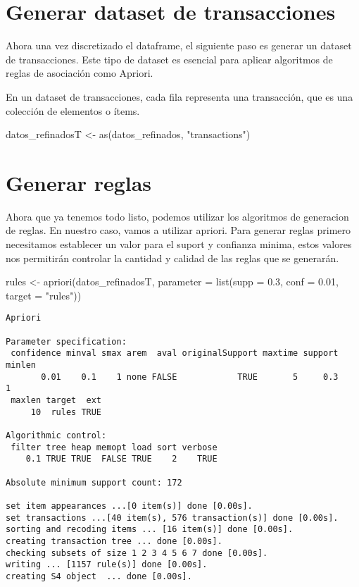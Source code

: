 \documentclass[
  letterpaper,
  DIV=11,
  numbers=noendperiod]{scrreprt}
\newenvironment{Shaded}{\begin{snugshade}}{\end{snugshade}}
\newcommand{\AttributeTok}[1]{\textcolor[rgb]{0.40,0.45,0.13}{#1}}
\newcommand{\FloatTok}[1]{\textcolor[rgb]{0.68,0.00,0.00}{#1}}
\newcommand{\FunctionTok}[1]{\textcolor[rgb]{0.28,0.35,0.67}{#1}}
\newcommand{\NormalTok}[1]{\textcolor[rgb]{0.00,0.23,0.31}{#1}}
\newcommand{\OtherTok}[1]{\textcolor[rgb]{0.00,0.23,0.31}{#1}}
\newcommand{\StringTok}[1]{\textcolor[rgb]{0.13,0.47,0.30}{#1}}
\begin{document}
\section{Generar dataset de
transacciones}\label{generar-dataset-de-transacciones}

Ahora una vez discretizado el dataframe, el siguiente paso es generar un
dataset de transacciones. Este tipo de dataset es esencial para aplicar
algoritmos de reglas de asociación como Apriori.

En un dataset de transacciones, cada fila representa una transacción,
que es una colección de elementos o ítems.

\begin{Shaded}
\begin{Highlighting}[]
\NormalTok{datos\_refinadosT }\OtherTok{\textless{}{-}} \FunctionTok{as}\NormalTok{(datos\_refinados, }\StringTok{"transactions"}\NormalTok{)}
\end{Highlighting}
\end{Shaded}

\section{Generar reglas}\label{generar-reglas}

Ahora que ya tenemos todo listo, podemos utilizar los algoritmos de
generacion de reglas. En nuestro caso, vamos a utilizar apriori. Para
generar reglas primero necesitamos establecer un valor para el suport y
confianza minima, estos valores nos permitirán controlar la cantidad y
calidad de las reglas que se generarán.

\begin{Shaded}
\begin{Highlighting}[]
\NormalTok{ rules }\OtherTok{\textless{}{-}} \FunctionTok{apriori}\NormalTok{(datos\_refinadosT,  }\AttributeTok{parameter =} \FunctionTok{list}\NormalTok{(}\AttributeTok{supp =} \FloatTok{0.3}\NormalTok{, }\AttributeTok{conf =} \FloatTok{0.01}\NormalTok{, }\AttributeTok{target =} \StringTok{"rules"}\NormalTok{)) }
\end{Highlighting}
\end{Shaded}

\begin{verbatim}
Apriori

Parameter specification:
 confidence minval smax arem  aval originalSupport maxtime support minlen
       0.01    0.1    1 none FALSE            TRUE       5     0.3      1
 maxlen target  ext
     10  rules TRUE

Algorithmic control:
 filter tree heap memopt load sort verbose
    0.1 TRUE TRUE  FALSE TRUE    2    TRUE

Absolute minimum support count: 172 

set item appearances ...[0 item(s)] done [0.00s].
set transactions ...[40 item(s), 576 transaction(s)] done [0.00s].
sorting and recoding items ... [16 item(s)] done [0.00s].
creating transaction tree ... done [0.00s].
checking subsets of size 1 2 3 4 5 6 7 done [0.00s].
writing ... [1157 rule(s)] done [0.00s].
creating S4 object  ... done [0.00s].
\end{verbatim}
\end{document}
